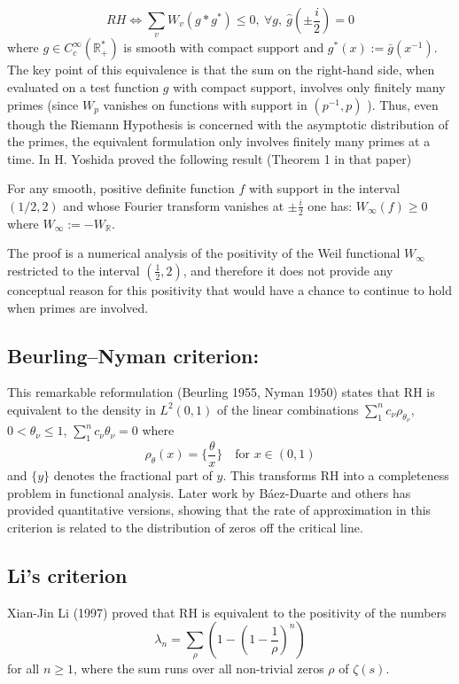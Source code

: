 \documentclass{article}
\begin{document}
$$R H \Longleftrightarrow \sum_v W_v\left(g * g^*\right) \leq 0,\ \forall g, \  \widehat{g}\left( \pm \frac{i}{2}\right)=0$$
where $g \in C_c^{\infty}\left(\mathbb{R}_{+}^*\right)$ is smooth with compact support and  $g^*(x):=\bar{g}\left(x^{-1}\right)$.
The key point of this equivalence is that the sum on the right-hand side, when evaluated on a test function $g$ with compact support, involves only finitely many primes (since $W_p$ vanishes on functions with support in $\left(p^{-1}, p\right)$ ). Thus, even though the Riemann Hypothesis is concerned with the asymptotic distribution of the primes, the equivalent formulation  only involves finitely many primes at a time. In \cite{yoshida} H. Yoshida proved the following result (Theorem 1 in that paper)
\begin{graybox}
For any smooth, positive definite function $f$ with support in the interval $(1 / 2,2)$ and whose Fourier transform vanishes at $\pm \frac{i}{2}$ one has: $W_{\infty}(f) \geq 0$ where $W_{\infty}:=-W_{\mathbb{R}}$.
\end{graybox}
The proof is a numerical analysis of the positivity of the Weil functional $W_{\infty}$ restricted to the interval $\left(\frac{1}{2}, 2\right)$, and therefore it does not provide any conceptual reason for this positivity that would have a chance to continue to hold when primes are involved.

 \subsection{Beurling–Nyman criterion:} This remarkable reformulation (Beurling 1955, Nyman 1950) states that RH is equivalent to the density  in $L^2(0,1)$ of  the linear combinations $\sum_1^n c_\nu\rho_{\theta_\nu}$, $0<\theta_\nu \leq 1$, $\sum_1^n c_\nu \theta_\nu=0$ where
    \[
    \rho_{\theta}(x) =\{ \frac{\theta}{x}\} \quad \text{for } x \in (0, 1)
    \]
    and $\{y\}$ denotes the fractional part of $y$. This transforms RH into a completeness problem in functional analysis. Later work by Báez-Duarte and others has provided quantitative versions, showing that the rate of approximation in this criterion is related to the distribution of zeros off the critical line.
    
    \subsection{Li's criterion}
   Xian-Jin Li (1997) proved \cite{XJL} that RH is equivalent to the positivity of the numbers
$$\lambda_n = \sum_{\rho} \left(1 - \left(1 - \frac{1}{\rho}\right)^n\right)$$
for all $n \geq 1$, where the sum runs over all non-trivial zeros $\rho$ of $\zeta(s)$.
\end{document}
